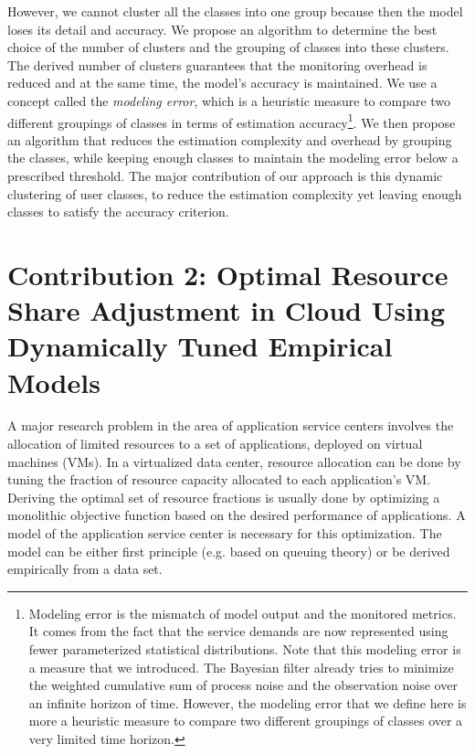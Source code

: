  However, we cannot cluster all the classes into one group because then the model loses its detail and accuracy. 
We propose an algorithm to determine the best choice of the number of clusters and the grouping of classes into these clusters.
The derived number of clusters guarantees that the monitoring overhead is reduced and at the same time, the model's accuracy is maintained. 
We use a concept called the \textit{modeling error}, which is a heuristic measure to compare two different groupings of classes in terms of estimation accuracy\footnote{Modeling error is the mismatch of model output and the monitored metrics. It comes from the fact that the service demands are now represented using fewer parameterized statistical distributions. Note that this modeling error is a measure that we introduced. 
The Bayesian filter already tries to minimize the weighted cumulative sum of process noise and the observation noise over an infinite horizon of time. However, the modeling error that we define here is more a heuristic measure to compare two different groupings of classes over a very limited time horizon. }.
We then propose an algorithm that reduces the estimation complexity and overhead by grouping the classes, while keeping enough classes to maintain the modeling error below a prescribed threshold. The major contribution of our approach is this dynamic clustering of user classes, to reduce the estimation complexity yet leaving enough classes to satisfy the accuracy criterion.  


 \section{Contribution 2: Optimal Resource Share Adjustment in Cloud Using Dynamically Tuned Empirical Models}    
\label{optimization_no_reconfiguration_cost} 
 A major research problem in the area of application service centers involves the allocation of limited resources to a set of applications, deployed on virtual machines (VMs). In a virtualized data center, resource allocation can be done by tuning the fraction of resource capacity allocated to each application's VM. 
Deriving the optimal set of resource fractions is usually done by optimizing a monolithic objective function based on the desired performance of applications. A model of the application service center is necessary for this optimization. The model can be either first principle (e.g. based on queuing theory) or be derived empirically from a data set.
 
